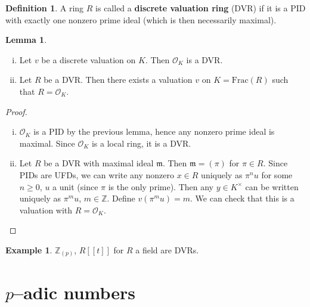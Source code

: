\documentclass{article}
\theoremstyle{definition}
\newtheorem{lemma}[theorem]{Lemma}
\newtheorem{example}{Example}[section]
\newtheorem{defn}{Definition}[section]
\begin{document}
\begin{defn}
    A ring $R$ is called a \textbf{discrete valuation ring} (DVR) if it is a PID with exactly one nonzero prime ideal (which is then necessarily maximal).
\end{defn}
\begin{lemma}
    \begin{enumerate}[(i)]
        \item Let $v$ be a discrete valuation on $K$. Then $\mathcal{O}_K$ is a DVR.
        \item Let $R$ be a DVR. Then there exists a valuation $v$ on $K = \text{Frac}(R)$ such that $R = \mathcal{O}_K$.
    \end{enumerate}
\end{lemma}
\begin{proof}
    \begin{enumerate}[(i)]
        \item $\mathcal{O}_K$ is a PID by the previous lemma, hence any nonzero prime ideal is maximal. Since $\mathcal{O}_K$ is a local ring, it is a DVR.
        \item Let $R$ be a DVR with maximal ideal $\mathfrak{m}$. Then $\mathfrak{m} = (\pi)$ for $\pi \in R$. Since PIDs are UFDs, we can write any nonzero $x \in R$ uniquely as $\pi^n u$ for some $n \ge 0$, $u$ a unit (since $\pi$ is the only prime). Then any $y \in K^{\times}$ can be written uniquely as $\pi^m u$, $m \in \mathbb{Z}$. Define $v(\pi^m u) = m$. We can check that this is a valuation with $R = \mathcal{O}_K$.
    \end{enumerate}
\end{proof}
\begin{example}
    $\mathbb{Z}_{(p)}$, $R[[t]]$ for $R$ a field are DVRs.
\end{example}

\section{$p$--adic numbers}
\end{document}
